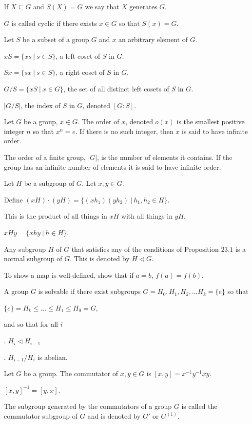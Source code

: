 \documentclass{article}
\newcommand\inv{^{-1}}
\begin{document}
If $X\subseteq G$ and $S(X)=G$ we say that $X$ generates $G$.

$G$ is called cyclic if there exists $x\in G$ so that $S(x) =G$.


Let $S$ be a subset of a group $G$ and $x$ an arbitrary element of $G$.

$xS = \{xs~|~s\in S\}$, a left coset of $S$ in $G$.

$Sx = \{sx~|~s\in S\}$, a right coset of $S$ in $G$.

$G/S = \{xS~|~x\in G\}$, the set of all distinct left cosets of $S$ in $G$.

$|G/S|$, the index of $S$ in $G$, denoted $[G:S]$.


Let $G$ be a group, $x\in G$. The order of $x$, denoted $o(x)$ is the smallest positive integer $n$ so that $x^n=e$. If there is no such integer, then $x$ is said to have infinite order.


The order of a finite group, $|G|$, is the number of elements it contains. If the group has an infinite number of elements it is said to have infinite order.


Let $H$ be a subgroup of $G$. Let $x,y\in G$.

Define $(xH) \cdot (yH) = \{(xh_1)(yh_2)~|~h_1,h_2\in H\}$.

This is the product of all things in $xH$ with all things in $yH$.

$xHy = \{xhy~|~h\in H\}$.


Any subgroup $H$ of $G$ that satisfies any of the conditions of Proposition $23.1$ is a normal subgroup of $G$. This is denoted by $H \lhd G$.


To show a map is well-defined, show that if $a=b$, $f(a)=f(b)$.


A group $G$ is solvable if there exist subgroups $G=H_0, H_1, H_2, \hdots H_k=\{e\}$ so that

$\{e\} = H_k \leq \hdots \leq H_1 \leq H_0 = G$,

and so that for all $i$

\indent{}. $H_i \lhd H_{i-1}$

\indent{}. $H_{i-1}/H_i$ is abelian.


Let $G$ be a group. The commutator of $x,y\in G$ is $[x,y]=x\inv y\inv x y$.

$[x,y]\inv = [y,x]$.


The subgroup generated by the commutators of a group $G$ is called the commutator subgroup of $G$ and is denoted by $G'$ or $G^{(1)}$.
\end{document}
